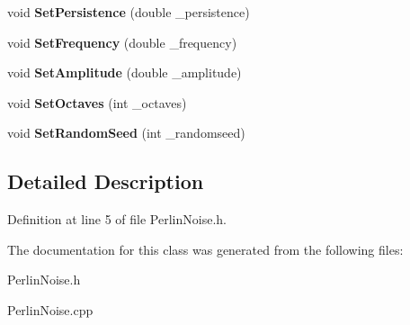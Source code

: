 \begin{DoxyCompactItemize}
void {\bfseries Set\+Persistence} (double \+\_\+persistence)
\item 
\mbox{\label{classPerlinNoise_adac1a028e0c19d621577ca4f2102820b}} 
void {\bfseries Set\+Frequency} (double \+\_\+frequency)
\item 
\mbox{\label{classPerlinNoise_adfe9927f5f81906d06224289b428baf5}} 
void {\bfseries Set\+Amplitude} (double \+\_\+amplitude)
\item 
\mbox{\label{classPerlinNoise_ad4a4d35a9758079460dd2091dca03266}} 
void {\bfseries Set\+Octaves} (int \+\_\+octaves)
\item 
\mbox{\label{classPerlinNoise_ae1d46c5446cb8f8226c83513c895245c}} 
void {\bfseries Set\+Random\+Seed} (int \+\_\+randomseed)
\end{DoxyCompactItemize}


\subsection{Detailed Description}


Definition at line 5 of file Perlin\+Noise.\+h.



The documentation for this class was generated from the following files\+:\begin{DoxyCompactItemize}
\item 
Perlin\+Noise.\+h\item 
Perlin\+Noise.\+cpp\end{DoxyCompactItemize}
